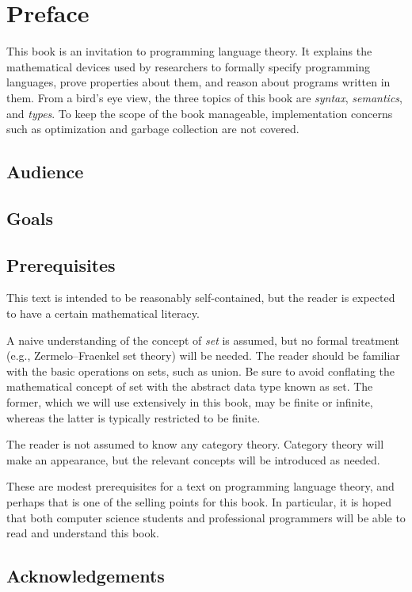 \chapter{Preface}

  This book is an invitation to programming language theory. It explains the mathematical devices used by researchers to formally specify programming languages, prove properties about them, and reason about programs written in them. From a bird's eye view, the three topics of this book are \emph{syntax}, \emph{semantics}, and \emph{types}. To keep the scope of the book manageable, implementation concerns such as optimization and garbage collection are not covered.

  \section*{Audience}

  \section*{Goals}

  \section*{Prerequisites}

    This text is intended to be reasonably self-contained, but the reader is expected to have a certain mathematical literacy.

    A naive understanding of the concept of \emph{set} is assumed, but no formal treatment (e.g., Zermelo--Fraenkel set theory) will be needed. The reader should be familiar with the basic operations on sets, such as union. Be sure to avoid conflating the mathematical concept of set with the abstract data type known as set. The former, which we will use extensively in this book, may be finite or infinite, whereas the latter is typically restricted to be finite.

    The reader is not assumed to know any category theory. Category theory will make an appearance, but the relevant concepts will be introduced as needed.

    These are modest prerequisites for a text on programming language theory, and perhaps that is one of the selling points for this book. In particular, it is hoped that both computer science students and professional programmers will be able to read and understand this book.

  \section*{Acknowledgements}

